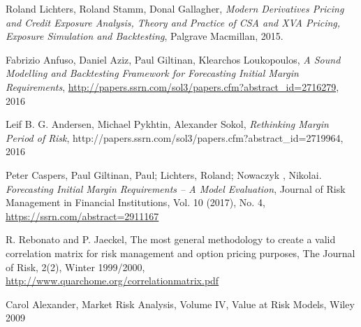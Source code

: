 \documentclass[12pt, a4paper]{article}
\begin{document}
\begin{thebibliography}{*}
 Roland Lichters, Roland Stamm, Donal Gallagher, {\em Modern Derivatives Pricing and Credit Exposure
    Analysis, Theory and Practice of CSA and XVA Pricing, Exposure Simulation and Backtesting}, Palgrave Macmillan,
  2015.

 Fabrizio Anfuso, Daniel Aziz, Paul Giltinan, Klearchos Loukopoulos, {\em A Sound Modelling and
    Backtesting Framework for Forecasting Initial Margin Requirements},
  \url{http://papers.ssrn.com/sol3/papers.cfm?abstract_id=2716279}, 2016

 Leif B. G. Andersen, Michael Pykhtin, Alexander Sokol, {\em Rethinking Margin Period of Risk},
  http://papers.ssrn.com/sol3/papers.cfm?abstract\_id=2719964, 2016




 Peter Caspers, Paul Giltinan, Paul; Lichters, Roland; Nowaczyk , Nikolai. {\em Forecasting Initial Margin Requirements – A Model Evaluation}, Journal of Risk Management in Financial Institutions, Vol. 10 (2017), No. 4, \url{https://ssrn.com/abstract=2911167}

 R. Rebonato and P. Jaeckel, The most general methodology to create a valid correlation matrix for
  risk management and option pricing purposes, The Journal of Risk, 2(2), Winter 1999/2000,
  \url{http://www.quarchome.org/correlationmatrix.pdf}

 Carol Alexander, Market Risk Analysis, Volume IV, Value at Risk Models, Wiley 2009

\end{thebibliography}

\newpage
{}
\listoftodos[Todo]
\end{document}
